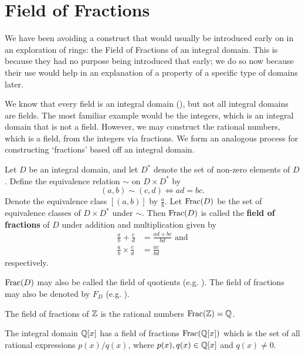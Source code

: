 \section{Field of Fractions}
We have been avoiding a construct that would usually be introduced early on in an exploration of rings: the Field of Fractions of an integral domain. This is because they had no purpose being introduced that early; we do so now because their use would help in an explanation of a property of a specific type of domains later.

We know that every field is an integral domain (), but not all integral domains are fields. The most familiar example would be the integers, which is an integral domain that is not a field. However, we may construct the rational numbers, which is a field, from the integers via fractions. We form an analogous process for constructing `fractions' based off an integral domain.

\begin{definition}\label{definition-field-of-fractions}
    Let $D$ be an integral domain, and let $D^\ast$ denote the set of non-zero elements of $D$. Define the equivalence relation $\sim$ on $D \times D^\ast$ by
    \[
        (a,b) \mathrel{\sim} (c,d) \iff ad = bc.
    \]
    Denote the equivalence class $[(a, b)]$ by $\frac ab$. Let $\mathrm{Frac}(D)$ be the set of equivalence classes of $D \times D^\ast$ under $\sim$. Then $\mathrm{Frac}(D)$ is called the \textbf{field of fractions} of $D$ under addition and multiplication given by
    \begin{align*}
        \frac ab + \frac cd &= \frac{ad+bc}{bd} \text{ and}\\
        \frac ab \times \frac cd &= \frac{ac}{bd}
    \end{align*}
    respectively.
\end{definition}
\begin{remark}
    $\mathrm{Frac}(D)$ may also be called the field of quotients (e.g. \cite[p.~269]{gallian_2016}). The field of fractions may also be denoted by $F_D$ (e.g. \cite[p.~226]{judson_beezer_2022}).
\end{remark}

\begin{example}
    The field of fractions of $\mathbb{Z}$ is the rational numbers $\mathrm{Frac}(\mathbb{Z}) = \mathbb{Q}$.
\end{example}
\begin{example}
    The integral domain $\mathbb{Q}[x]$ has a field of fractions $\mathrm{Frac}(\mathbb{Q}[x])$ which is the set of all rational expressions $p(x)/q(x)$, where $p(x), q(x) \in \mathbb{Q}[x]$ and $q(x) \neq 0$.
\end{example}

